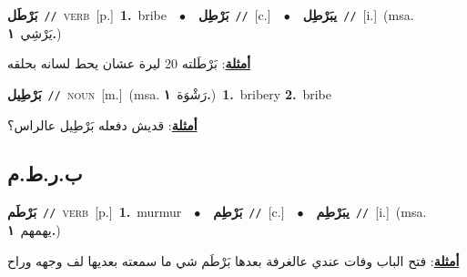 \documentclass[10pt,a4paper,twoside]{article} %
\begin{document}
\begin{multicols}{2}
{\setlength\topsep{0pt}\textbf{\foreignlanguage{arabic}{بَرْطَل}}\ {\color{gray}\texttt{//}\color{black}}\ \textsc{verb}\ [p.]\ \textbf{1.}~bribe\ \ $\bullet$\ \ \setlength\topsep{0pt}\textbf{\foreignlanguage{arabic}{بَرْطِل}}\ {\color{gray}\texttt{//}\color{black}}\ [c.]\ \ $\bullet$\ \ \setlength\topsep{0pt}\textbf{\foreignlanguage{arabic}{يبَرْطِل}}\ {\color{gray}\texttt{//}\color{black}}\ [i.]\ \color{gray}(msa. \foreignlanguage{arabic}{يَرْشِي}~\foreignlanguage{arabic}{\textbf{١.}})\color{black}\  \begin{flushright}\color{gray}\foreignlanguage{arabic}{\textbf{\underline{\foreignlanguage{arabic}{أمثلة}}}: بَرْطَلته 20 ليرة عشان يحط لسانه بحلقه}\end{flushright}\color{black}} \vspace{2mm}

{\setlength\topsep{0pt}\textbf{\foreignlanguage{arabic}{بَرْطِيل}}\ {\color{gray}\texttt{//}\color{black}}\ \textsc{noun}\ [m.]\ \color{gray}(msa. \foreignlanguage{arabic}{رَشْوَة}~\foreignlanguage{arabic}{\textbf{١.}})\color{black}\ \textbf{1.}~bribery  \textbf{2.}~bribe\  \begin{flushright}\color{gray}\foreignlanguage{arabic}{\textbf{\underline{\foreignlanguage{arabic}{أمثلة}}}: قديش دفعله بَرْطِيل عالراس؟}\end{flushright}\color{black}} \vspace{2mm}

\vspace{-3mm}
\subsection*{\color{blue}\foreignlanguage{arabic}{ب.ر.ط.م}\color{blue}{}} 

{\setlength\topsep{0pt}\textbf{\foreignlanguage{arabic}{بَرْطَم}}\ {\color{gray}\texttt{//}\color{black}}\ \textsc{verb}\ [p.]\ \textbf{1.}~murmur\ \ $\bullet$\ \ \setlength\topsep{0pt}\textbf{\foreignlanguage{arabic}{بَرْطِم}}\ {\color{gray}\texttt{//}\color{black}}\ [c.]\ \ $\bullet$\ \ \setlength\topsep{0pt}\textbf{\foreignlanguage{arabic}{يبَرْطِم}}\ {\color{gray}\texttt{//}\color{black}}\ [i.]\ \color{gray}(msa. \foreignlanguage{arabic}{يهمهم}~\foreignlanguage{arabic}{\textbf{١.}})\color{black}\  \begin{flushright}\color{gray}\foreignlanguage{arabic}{\textbf{\underline{\foreignlanguage{arabic}{أمثلة}}}: فتح الباب وفات عندي عالغرفة بعدها بَرْطَم شي ما سمعته بعديها لف وجهه وراح}\end{flushright}\color{black}} \vspace{2mm}


\end{multicols}
\end{document}
